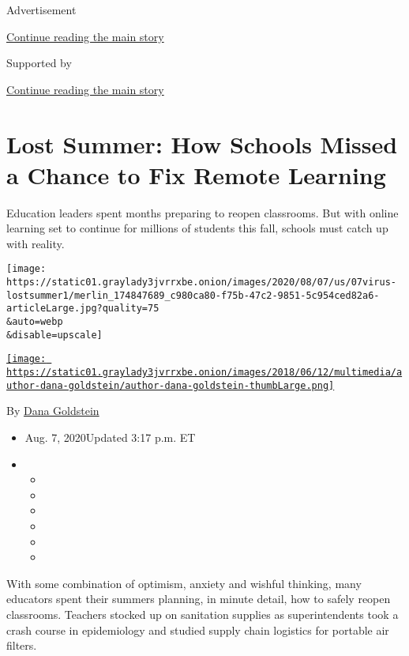 Advertisement

\protect\hyperlink{after-top}{Continue reading the main story}

Supported by

\protect\hyperlink{after-sponsor}{Continue reading the main story}

\hypertarget{lost-summer-how-schools-missed-a-chance-to-fix-remote-learning}{%
\section{Lost Summer: How Schools Missed a Chance to Fix Remote
Learning}\label{lost-summer-how-schools-missed-a-chance-to-fix-remote-learning}}

Education leaders spent months preparing to reopen classrooms. But with
online learning set to continue for millions of students this fall,
schools must catch up with reality.

\texttt{[image: https://static01.graylady3jvrrxbe.onion/images/2020/08/07/us/07virus-lostsummer1/merlin\_174847689\_c980ca80-f75b-47c2-9851-5c954ced82a6-articleLarge.jpg?quality=75\\\&auto=webp\\\&disable=upscale]}

\href{https://www.nytimes3xbfgragh.onion/by/dana-goldstein}{\texttt{[image: https://static01.graylady3jvrrxbe.onion/images/2018/06/12/multimedia/author-dana-goldstein/author-dana-goldstein-thumbLarge.png]}}

By \href{https://www.nytimes3xbfgragh.onion/by/dana-goldstein}{Dana
Goldstein}

\begin{itemize}
\item
  Aug. 7, 2020Updated 3:17 p.m. ET
\item
  \begin{itemize}
  \item
  \item
  \item
  \item
  \item
  \item
  \end{itemize}
\end{itemize}

With some combination of optimism, anxiety and wishful thinking, many
educators spent their summers planning, in minute detail, how to safely
reopen classrooms. Teachers stocked up on sanitation supplies as
superintendents took a crash course in epidemiology and studied supply
chain logistics for portable air filters.

